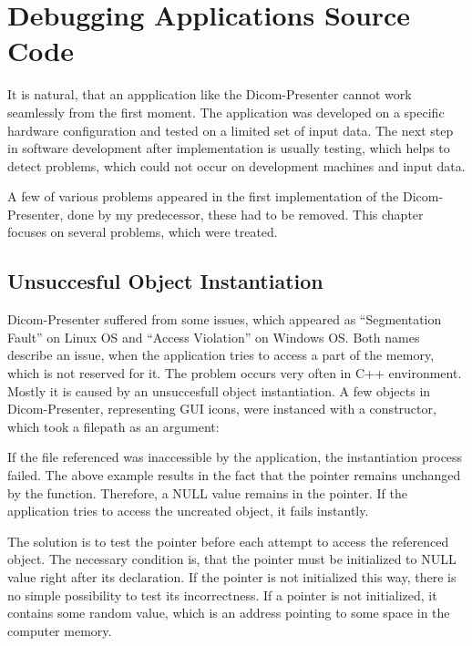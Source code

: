 \chapter{Debugging Applications Source Code}
\vspace{-10mm}
It is natural, that an appplication like the Dicom-Presenter cannot work seamlessly from the first moment. The application was developed on a specific hardware configuration and tested on a limited set of input data. The next step in software development after implementation is usually testing, which helps to detect problems, which could not occur on development machines and input data.

A few of various problems appeared in the first implementation of the Dicom-Presenter, done by my predecessor\cite{neskudla}, these had to be removed. This chapter focuses on several problems, which were treated.

\section{Unsuccesful Object Instantiation}
Dicom-Presenter suffered from some issues, which appeared as ``Segmentation Fault'' on Linux OS and ``Access Violation'' on Windows OS. Both names describe an issue, when the application tries to access a part of the memory, which is not reserved for it. The problem occurs very often in C++ environment. Mostly it is caused by an unsuccesfull object instantiation. A few objects in Dicom-Presenter, representing GUI icons, were instanced with a constructor, which took a filepath as an argument:


If the file referenced was inaccessible by the application, the instantiation process failed. The above example results in the fact that the  pointer remains unchanged by the  function. Therefore, a NULL value remains in the pointer. If the application tries to access the uncreated object, it fails instantly.

The solution is to test the pointer before each attempt to access the referenced object. The necessary condition is, that the pointer  must be initialized to NULL value right after its declaration. If the pointer is not initialized this way, there is no simple possibility to test its incorrectness. If a pointer is not initialized, it contains some random value, which is an address pointing to some space in the computer memory.

